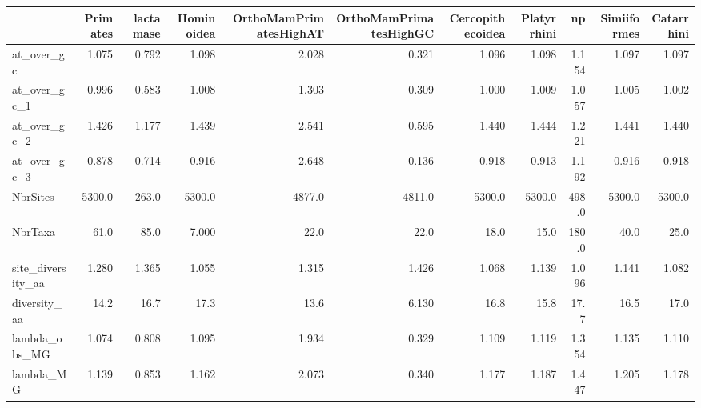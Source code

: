 \begin{tabular}{lrrrrrrrrrr}
\toprule
{} &      Primates &    lactamase &   Hominoidea & OrthoMamPrimatesHighAT & OrthoMamPrimatesHighGC & Cercopithecoidea &   Platyrrhini &           np &   Simiiformes &   Catarrhini \\
\midrule
at\_over\_gc        &         1.075 &        0.792 &        1.098 &                  2.028 &                  0.321 &            1.096 &         1.098 &        1.154 &         1.097 &        1.097 \\
at\_over\_gc\_1      &         0.996 &        0.583 &        1.008 &                  1.303 &                  0.309 &            1.000 &         1.009 &        1.057 &         1.005 &        1.002 \\
at\_over\_gc\_2      &         1.426 &        1.177 &        1.439 &                  2.541 &                  0.595 &            1.440 &         1.444 &        1.221 &         1.441 &        1.440 \\
at\_over\_gc\_3      &         0.878 &        0.714 &        0.916 &                  2.648 &                  0.136 &            0.918 &         0.913 &        1.192 &         0.916 &        0.918 \\
NbrSites          &        5300.0 &        263.0 &       5300.0 &                 4877.0 &                 4811.0 &           5300.0 &        5300.0 &        498.0 &        5300.0 &       5300.0 \\
NbrTaxa           &          61.0 &         85.0 &        7.000 &                   22.0 &                   22.0 &             18.0 &          15.0 &        180.0 &          40.0 &         25.0 \\
site\_diversity\_aa &         1.280 &        1.365 &        1.055 &                  1.315 &                  1.426 &            1.068 &         1.139 &        1.096 &         1.141 &        1.082 \\
diversity\_aa      &          14.2 &         16.7 &         17.3 &                   13.6 &                  6.130 &             16.8 &          15.8 &         17.7 &          16.5 &         17.0 \\
lambda\_obs\_MG     &         1.074 &        0.808 &        1.095 &                  1.934 &                  0.329 &            1.109 &         1.119 &        1.354 &         1.135 &        1.110 \\
lambda\_MG         &         1.139 &        0.853 &        1.162 &                  2.073 &                  0.340 &            1.177 &         1.187 &        1.447 &         1.205 &        1.178 \\

\end{tabular}
